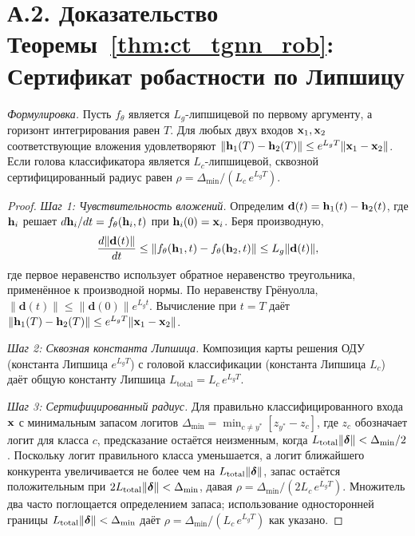 \section*{А.2. Доказательство Теоремы~\ref{thm:ct_tgnn_rob}: Сертификат робастности по Липшицу}
\label{app:proof_ct_rob}

\noindent\textit{Формулировка.} Пусть $f_\theta$ является $L_g$-липшицевой по первому аргументу, а горизонт интегрирования равен $T$. Для любых двух входов $\mathbf{x}_1,\mathbf{x}_2$ соответствующие вложения удовлетворяют $\|\mathbf{h}_1(T)-\mathbf{h}_2(T)\|\le e^{L_g T}\|\mathbf{x}_1-\mathbf{x}_2\|$. Если голова классификатора является $L_c$-липшицевой, сквозной сертифицированный радиус равен $\rho = \Delta_{\min}/(L_c\,e^{L_g T})$.

\begin{proof}
\textit{Шаг 1: Чувствительность вложений.} Определим $\mathbf{d}(t) = \mathbf{h}_1(t)-\mathbf{h}_2(t)$, где $\mathbf{h}_i$ решает $d\mathbf{h}_i/dt = f_\theta(\mathbf{h}_i,t)$ при $\mathbf{h}_i(0)=\mathbf{x}_i$. Беря производную,
\begin{equation}
\frac{d\|\mathbf{d}(t)\|}{dt}
\le \|f_\theta(\mathbf{h}_1,t)-f_\theta(\mathbf{h}_2,t)\|
\le L_g\|\mathbf{d}(t)\|,
\end{equation}
где первое неравенство использует обратное неравенство треугольника, применённое к производной нормы. По неравенству Грёнуолла, $\|\mathbf{d}(t)\|\le\|\mathbf{d}(0)\|e^{L_g t}$. Вычисление при $t=T$ даёт $\|\mathbf{h}_1(T)-\mathbf{h}_2(T)\|\le e^{L_g T}\|\mathbf{x}_1-\mathbf{x}_2\|$.

\textit{Шаг 2: Сквозная константа Липшица.} Композиция карты решения ОДУ (константа Липшица $e^{L_g T}$) с головой классификации (константа Липшица $L_c$) даёт общую константу Липшица $L_{\mathrm{total}} = L_c\,e^{L_g T}$.

\textit{Шаг 3: Сертифицированный радиус.} Для правильно классифицированного входа $\mathbf{x}$ с минимальным запасом логитов $\Delta_{\min}=\min_{c\neq y^*}[z_{y^*}-z_c]$, где $z_c$ обозначает логит для класса $c$, предсказание остаётся неизменным, когда $L_{\mathrm{total}}\|\boldsymbol{\delta}\|<\Delta_{\min}/2$. Поскольку логит правильного класса уменьшается, а логит ближайшего конкурента увеличивается не более чем на $L_{\mathrm{total}}\|\boldsymbol{\delta}\|$, запас остаётся положительным при $2L_{\mathrm{total}}\|\boldsymbol{\delta}\|<\Delta_{\min}$, давая $\rho = \Delta_{\min}/(2L_c\,e^{L_g T})$. Множитель два часто поглощается определением запаса; использование односторонней границы $L_{\mathrm{total}}\|\boldsymbol{\delta}\|<\Delta_{\min}$ даёт $\rho = \Delta_{\min}/(L_c\,e^{L_g T})$ как указано.
\end{proof}


